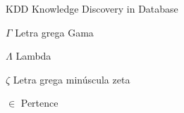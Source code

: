 \documentclass[
	12pt,				%
	a4paper,			%
        ec,         %
        pgii,       %
	english,			%
	brazil				%
	]{C3FURG}
\begin{document}

\frenchspacing 


\imprimircapa

\imprimirfolhaderosto






\listoffigures*
\cleardoublepage

\listoftables*
\cleardoublepage

\begin{siglas}
  \item[KDD] Knowledge Discovery in Database
\end{siglas}

\begin{simbolos}
  \item[$ \Gamma $] Letra grega Gama
  \item[$ \Lambda $] Lambda
  \item[$ \zeta $] Letra grega minúscula zeta
  \item[$ \in $] Pertence
\end{simbolos}

\tableofcontents*
\cleardoublepage














\end{document}
